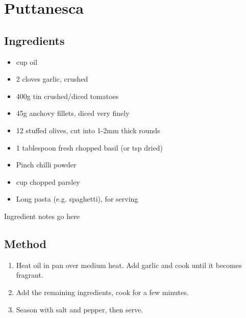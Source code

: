 \clearpage
\section{Puttanesca}


\subsection{Ingredients}

\begin{itemize}
    \item {} cup oil
    \item 2 cloves garlic, crushed
    \item 400g tin crushed/diced tomatoes
    \item 45g anchovy fillets, diced very finely
    \item 12 stuffed olives, cut into 1-2mm thick rounds
    \item 1 tablespoon fresh chopped basil (or  tsp dried)
    \item Pinch chilli powder
    \item {} cup chopped parsley
    \item Long pasta (e.g. spaghetti), for serving
\end{itemize}

Ingredient notes go here

\subsection{Method}

\begin{enumerate}
    \item Heat oil in pan over medium heat. Add garlic and cook until it becomes fragrant.
    \item Add the remaining ingredients, cook for a few minutes.
    \item Season with salt and pepper, then serve.
\end{enumerate}
